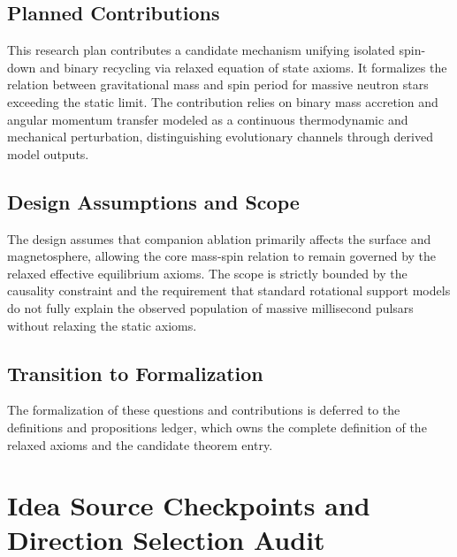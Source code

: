 \documentclass[conference]{IEEEtran}
\begin{document}
\subsection{Planned Contributions}
This research plan contributes a candidate mechanism unifying isolated spin-down and binary recycling via relaxed equation of state axioms. It formalizes the relation between gravitational mass and spin period for massive neutron stars exceeding the static limit. The contribution relies on binary mass accretion and angular momentum transfer modeled as a continuous thermodynamic and mechanical perturbation, distinguishing evolutionary channels through derived model outputs.~\cite{cite_55957f4ce67bd972}

\subsection{Design Assumptions and Scope}
The design assumes that companion ablation primarily affects the surface and magnetosphere, allowing the core mass-spin relation to remain governed by the relaxed effective equilibrium axioms. The scope is strictly bounded by the causality constraint and the requirement that standard rotational support models do not fully explain the observed population of massive millisecond pulsars without relaxing the static axioms.~\cite{cite_1e5d552669fc0c56}

\subsection{Transition to Formalization}
The formalization of these questions and contributions is deferred to the definitions and propositions ledger, which owns the complete definition of the relaxed axioms and the candidate theorem entry.~\cite{cite_55957f4ce67bd972}

\section{Idea Source Checkpoints and Direction Selection Audit}
\end{document}
